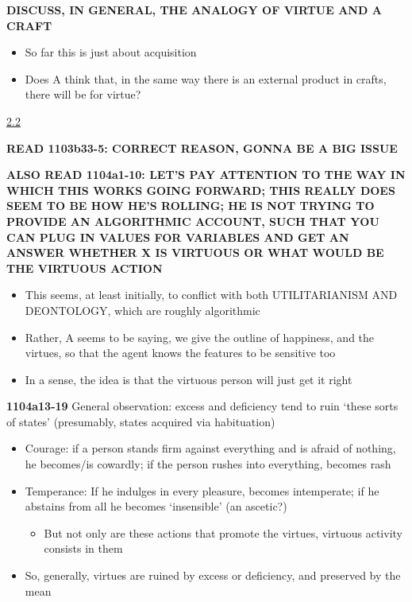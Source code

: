 \documentclass[11pt]{article}
\begin{document}
\noindent\textbf{DISCUSS, IN GENERAL, THE ANALOGY OF VIRTUE AND A CRAFT}

\begin{itemize}\item{So far this is just about acquisition}\item{Does A think that, in the same way there is an external product in crafts, there will be for virtue?}\end{itemize}

\noindent\underline{2.2}
\vspace*{2mm}

\noindent\textbf{READ 1103b33-5: CORRECT REASON, GONNA BE A BIG ISSUE}
\vspace*{2mm}

\noindent\textbf{ALSO READ 1104a1-10: LET'S PAY ATTENTION TO THE WAY IN WHICH THIS WORKS GOING FORWARD; THIS REALLY DOES SEEM TO BE HOW HE'S ROLLING; HE IS NOT TRYING TO PROVIDE AN ALGORITHMIC ACCOUNT, SUCH THAT YOU CAN PLUG IN VALUES FOR VARIABLES AND GET AN ANSWER WHETHER X IS VIRTUOUS OR WHAT WOULD BE THE VIRTUOUS ACTION}

\begin{itemize}\item{This seems, at least initially, to conflict with both UTILITARIANISM AND DEONTOLOGY, which are roughly algorithmic}\item{Rather, A seems to be saying, we give the outline of happiness, and the virtues, so that the agent knows the features to be sensitive too}\item{In a sense, the idea is that the virtuous person will just get it right}\end{itemize}

\noindent\textbf{1104a13-19} General observation: excess and deficiency tend to ruin `these sorts of states' (presumably, states acquired via habituation)

\begin{itemize}\item{Courage: if a person stands firm against everything and is afraid of nothing, he becomes/is cowardly; if the person rushes into everything, becomes rash}\item{Temperance: If he indulges in every pleasure, becomes intemperate; if he abstains from all he becomes `insensible' (an ascetic?)}\begin{itemize}\item{But not only are these actions that promote the virtues, virtuous activity consists in them}\end{itemize}\item{So, generally, virtues are ruined by excess or deficiency, and preserved by the mean}\end{itemize}
\end{document}
